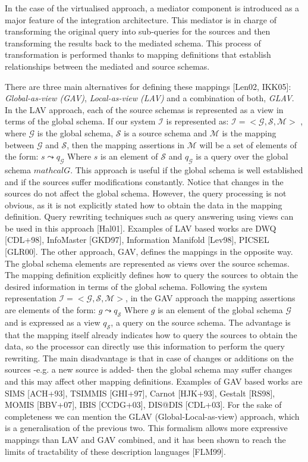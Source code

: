 In the case of the virtualised approach, a mediator component is introduced as a major feature of the integration architecture. This mediator is in charge of transforming the original query into sub-queries for the sources and then transforming the results back to the mediated schema. This process of transformation is performed thanks to mapping definitions that establish relationships between the mediated and source schemas. 

There are three main alternatives for defining these mappings [Len02, IKK05]: \textit{Global-as-view (GAV)}, \textit{Local-as-view (LAV)} and a combination of both, \textit{GLAV}.
In the LAV approach, each of the source schemas is represented as a view in terms of the global schema. If our system $\mathcal{I}$ is represented as:
$\mathcal{I = <G,S,M>}$ , where $\mathcal{G}$ is the global schema, $\mathcal{S}$ is a source schema and $\mathcal{M}$ is the mapping between $\mathcal{G}$ and $\mathcal{S}$, then the mapping assertions in $\mathcal{M}$ will be a set of elements of the form:
$s \leadsto q_{\mathcal{G}}$
Where $s$ is an element of $\mathcal{S}$ and $q_{\mathcal{G}}$ is a query over the global schema $mathcal{G}$.
This approach is useful if the global schema is well established and if the sources suffer modifications constantly. Notice that changes in the sources do not affect the global schema. However, the query processing is not obvious, as it is not explicitly stated how to obtain the data in the mapping definition. Query rewriting techniques such as query answering using views can be used in this approach [Hal01]. Examples of LAV based works are DWQ [CDL+98], InfoMaster [GKD97], Information Manifold [Lev98], PICSEL [GLR00].
The other approach, GAV, defines the mappings in the opposite way. The global schema elements are represented as views over the source schemas. The mapping definition explicitly defines how to query the sources to obtain the desired information in terms of the global schema. Following the system representation $\mathcal{I = <G,S,M>}$, in the GAV approach the mapping assertions are elements of the form:
$g \leadsto q_{\mathcal{S}}$
Where $g$ is an element of the global schema $\mathcal{G}$ and is expressed as a view $q_{\mathcal{S}}$, a query on the source schema. The advantage is that the mapping itself already indicates how to query the sources to obtain the data, so the processor can directly use this information to perform the query rewriting. The main disadvantage is that in case of changes or additions on the sources -e.g. a new source is added- then the global schema may suffer changes and this may affect other mapping definitions. Examples of GAV based works are SIMS [ACH+93], TSIMMIS [GHI+97], Carnot [HJK+93], Gestalt [RS98], MOMIS [BBV+07], IBIS [CCDG+03], DIS@DIS [CDL+03].
For the sake of completeness we can mention the GLAV (Global-Local-as-view) approach, which is a generalisation of the previous two. This formalism allows more expressive mappings than LAV and GAV combined, and it has been shown to reach the limits of tractability of these description languages [FLM99].
